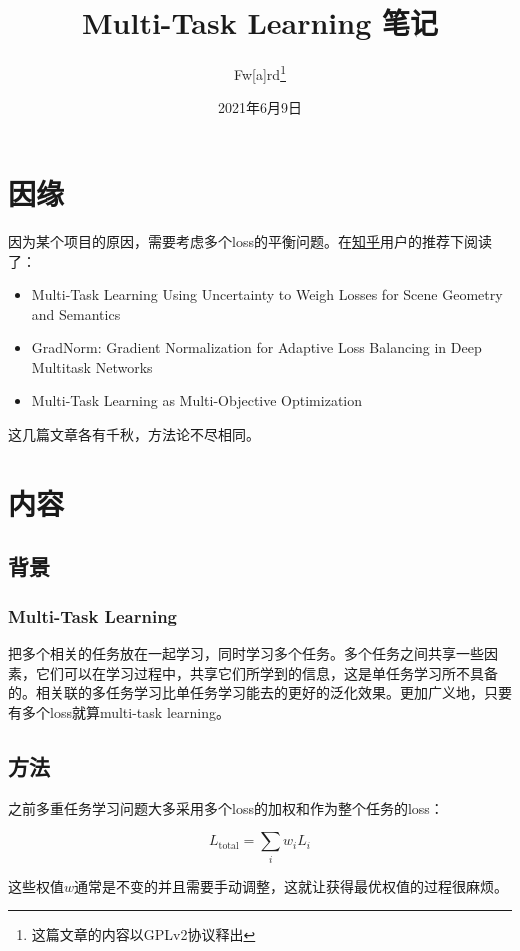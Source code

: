 \documentclass[a4paper,punct]{ctexart}
\title{Multi-Task Learning 笔记}
\author{Fw[a]rd\thanks{这篇文章的内容以GPLv2协议释出}}
\date{2021年6月9日}
\begin{document}
\maketitle

\section{因缘}
因为某个项目的原因，需要考虑多个loss的平衡问题。在\href{https://www.zhihu.com/question/375794498}{知乎}用户的推荐下阅读了：

\begin{itemize}
    \item Multi-Task Learning Using Uncertainty to Weigh Losses for Scene Geometry and Semantics\cite{Kendall18Uncertainty}
    \item GradNorm: Gradient Normalization for Adaptive Loss Balancing in Deep Multitask Networks\cite{Chen18GradNorm}
    \item Multi-Task Learning as Multi-Objective Optimization\cite{Sener18Pareto}
\end{itemize}

这几篇文章各有千秋，方法论不尽相同。

\section{内容}
\subsection{背景}
\subsubsection{Multi-Task Learning}
把多个相关的任务放在一起学习，同时学习多个任务。多个任务之间共享一些因素，它们可以在学习过程中，共享它们所学到的信息，这是单任务学习所不具备的。相关联的多任务学习比单任务学习能去的更好的泛化效果。更加广义地，只要有多个loss就算multi-task learning。

\subsection{方法}

之前多重任务学习问题大多采用多个loss的加权和作为整个任务的loss：

\begin{equation}
    L_\mathrm{total} = \sum_i w_iL_i
\end{equation}

这些权值$w$通常是不变的并且需要手动调整，这就让获得最优权值的过程很麻烦。
\end{document}
